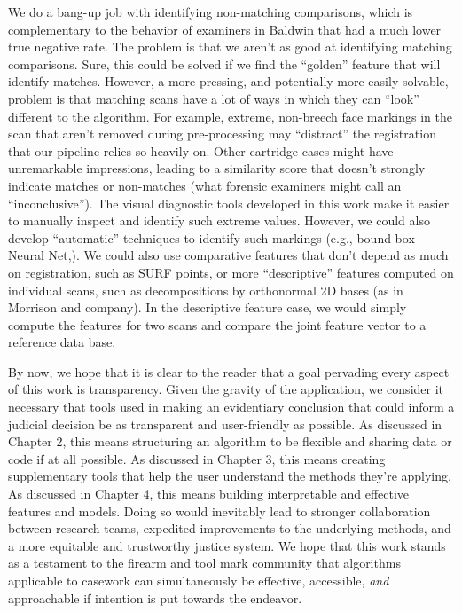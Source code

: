 \documentclass[11pt,]{isuthesis}
\begin{document}
We do a bang-up job with identifying non-matching comparisons, which is complementary to the behavior of examiners in Baldwin that had a much lower true negative rate.
The problem is that we aren't as good at identifying matching comparisons.
Sure, this could be solved if we find the ``golden'' feature that will identify matches.
However, a more pressing, and potentially more easily solvable, problem is that matching scans have a lot of ways in which they can ``look'' different to the algorithm.
For example, extreme, non-breech face markings in the scan that aren't removed during pre-processing may ``distract'' the registration that our pipeline relies so heavily on.
Other cartridge cases might have unremarkable impressions, leading to a similarity score that doesn't strongly indicate matches or non-matches (what forensic examiners might call an ``inconclusive'').
The visual diagnostic tools developed in this work make it easier to manually inspect and identify such extreme values.
However, we could also develop ``automatic'' techniques to identify such markings (e.g., bound box Neural Net,).
We could also use comparative features that don't depend as much on registration, such as SURF points, or more ``descriptive'' features computed on individual scans, such as decompositions by orthonormal 2D bases (as in Morrison and company).
In the descriptive feature case, we would simply compute the features for two scans and compare the joint feature vector to a reference data base.

By now, we hope that it is clear to the reader that a goal pervading every aspect of this work is transparency.
Given the gravity of the application, we consider it necessary that tools used in making an evidentiary conclusion that could inform a judicial decision be as transparent and user-friendly as possible.
As discussed in Chapter 2, this means structuring an algorithm to be flexible and sharing data or code if at all possible.
As discussed in Chapter 3, this means creating supplementary tools that help the user understand the methods they're applying.
As discussed in Chapter 4, this means building interpretable and effective features and models.
Doing so would inevitably lead to stronger collaboration between research teams, expedited improvements to the underlying methods, and a more equitable and trustworthy justice system.
We hope that this work stands as a testament to the firearm and tool mark community that algorithms applicable to casework can simultaneously be effective, accessible, \emph{and} approachable if intention is put towards the endeavor.

\renewcommand\bibname{\centerline{REFERENCES}}
\unappendixtitle
\newpage
{}
{}

\end{document}
